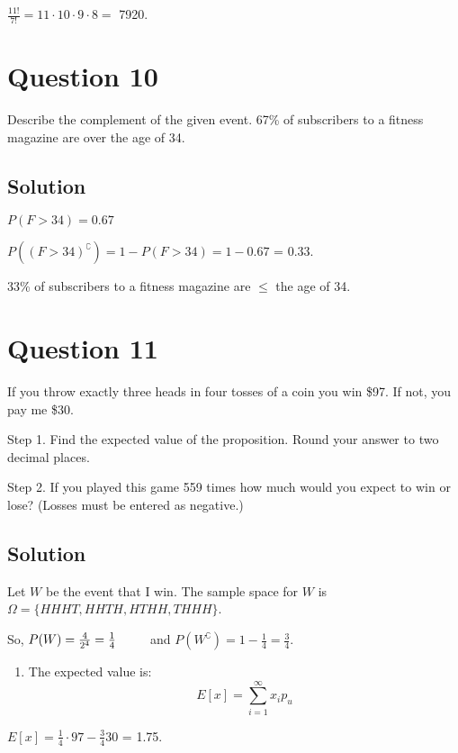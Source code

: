 \documentclass[]{article}
\providecommand{\tightlist}{%
  \setlength{\itemsep}{0pt}\setlength{\parskip}{0pt}}
\begin{document}
\(\frac{11!}{7!} = 11 \cdot 10 \cdot 9 \cdot 8 =\) 7920.

\section{Question 10}\label{question-10}

Describe the complement of the given event. 67\% of subscribers to a
fitness magazine are over the age of 34.

\subsection{Solution}\label{solution-9}

\(P(F > 34) = 0.67\)

\(P((F > 34)^{\complement}) = 1 - P(F > 34) = 1 - 0.67\) = 0.33.

33\% of subscribers to a fitness magazine are \(\leq\) the age of 34.

\section{Question 11}\label{question-11}

If you throw exactly three heads in four tosses of a coin you win \$97.
If not, you pay me \$30.

Step 1. Find the expected value of the proposition. Round your answer to
two decimal places.

Step 2. If you played this game 559 times how much would you expect to
win or lose? (Losses must be entered as negative.)

\subsection{Solution}\label{solution-10}

Let \(W\) be the event that I win. The sample space for \(W\) is
\(\Omega = \{HHHT, HHTH, HTHH, THHH\}\).

So, \(P(W) = \frac{4}{2^4} = \frac{1}{4} \hspace{8mm}\) and
\(P(W^{\complement}) = 1 - \frac{1}{4} = \frac{3}{4}\).

\begin{enumerate}
\def\labelenumi{\arabic{enumi})}
\tightlist
\item
  The expected value is: \[E[x] = \sum_{i=1}^{\infty} x_{i}p_{u}\]
\end{enumerate}

\(E[x] = \frac{1}{4}\cdot97 - \frac{3}{4}30\) = 1.75.
\end{document}
